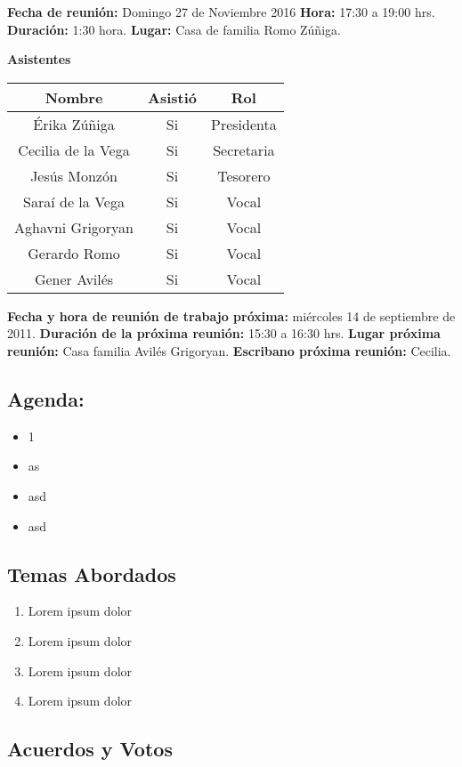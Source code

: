 \documentclass[]{book}
\providecommand{\tightlist}{%
  \setlength{\itemsep}{0pt}\setlength{\parskip}{0pt}}
\begin{document}
\textbf{Fecha de reunión:} Domingo 27 de Noviembre 2016 \textbf{Hora:}
17:30 a 19:00 hrs. \textbf{Duración:} 1:30 hora. \textbf{Lugar:} Casa de
familia Romo Zúñiga.

\textbf{Asistentes}

\begin{longtable}[]{@{}ccc@{}}
\toprule
Nombre & Asistió & Rol\tabularnewline
\midrule
\endhead
Érika Zúñiga & Si & Presidenta\tabularnewline
Cecilia de la Vega & Si & Secretaria\tabularnewline
Jesús Monzón & Si & Tesorero\tabularnewline
Saraí de la Vega & Si & Vocal\tabularnewline
Aghavni Grigoryan & Si & Vocal\tabularnewline
Gerardo Romo & Si & Vocal\tabularnewline
Gener Avilés & Si & Vocal\tabularnewline
\bottomrule
\end{longtable}

 \textbf{Fecha y hora de reunión de trabajo próxima:} miércoles 14 de
septiembre de 2011. \textbf{Duración de la próxima reunión:} 15:30 a
16:30 hrs. \textbf{Lugar próxima reunión:} Casa familia Avilés
Grigoryan. \textbf{Escribano próxima reunión:} Cecilia.

\subsection{Agenda:}\label{agenda}

\begin{itemize}
\tightlist
\item
  1
\item
  as
\item
  asd
\item
  asd
\end{itemize}

\subsection{Temas Abordados}\label{temas-abordados}

\begin{enumerate}
\def\labelenumi{\arabic{enumi}.}
\tightlist
\item
  Lorem ipsum dolor
\item
  Lorem ipsum dolor
\item
  Lorem ipsum dolor
\item
  Lorem ipsum dolor
\end{enumerate}

\subsection{Acuerdos y Votos}\label{acuerdos-y-votos}
\end{document}

